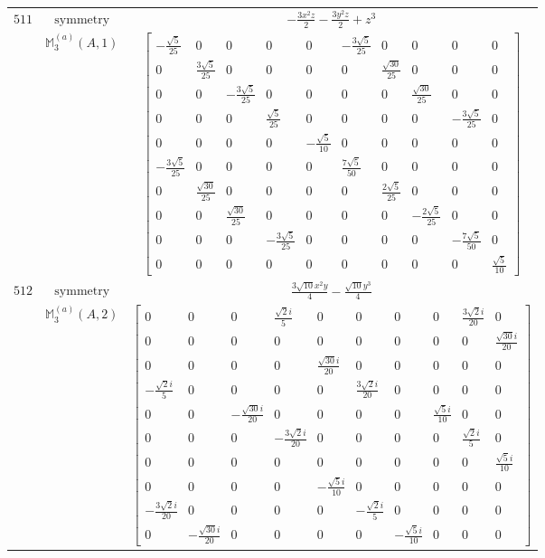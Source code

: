\documentclass[fleqn,8pt,landscape]{jsarticle}
\begin{document}
\begin{longtable}{ccc}
$ 511 $ & $ \text{symmetry} $ & $ - \frac{3 x^{2} z}{2} - \frac{3 y^{2} z}{2} + z^{3} $ \\
$  $ & $ \mathbb{M}_{3}^{(a)}(A,1) $ & $ \begin{bmatrix} - \frac{\sqrt{5}}{25} & 0 & 0 & 0 & 0 & - \frac{3 \sqrt{5}}{25} & 0 & 0 & 0 & 0 \\ 0 & \frac{3 \sqrt{5}}{25} & 0 & 0 & 0 & 0 & \frac{\sqrt{30}}{25} & 0 & 0 & 0 \\ 0 & 0 & - \frac{3 \sqrt{5}}{25} & 0 & 0 & 0 & 0 & \frac{\sqrt{30}}{25} & 0 & 0 \\ 0 & 0 & 0 & \frac{\sqrt{5}}{25} & 0 & 0 & 0 & 0 & - \frac{3 \sqrt{5}}{25} & 0 \\ 0 & 0 & 0 & 0 & - \frac{\sqrt{5}}{10} & 0 & 0 & 0 & 0 & 0 \\ - \frac{3 \sqrt{5}}{25} & 0 & 0 & 0 & 0 & \frac{7 \sqrt{5}}{50} & 0 & 0 & 0 & 0 \\ 0 & \frac{\sqrt{30}}{25} & 0 & 0 & 0 & 0 & \frac{2 \sqrt{5}}{25} & 0 & 0 & 0 \\ 0 & 0 & \frac{\sqrt{30}}{25} & 0 & 0 & 0 & 0 & - \frac{2 \sqrt{5}}{25} & 0 & 0 \\ 0 & 0 & 0 & - \frac{3 \sqrt{5}}{25} & 0 & 0 & 0 & 0 & - \frac{7 \sqrt{5}}{50} & 0 \\ 0 & 0 & 0 & 0 & 0 & 0 & 0 & 0 & 0 & \frac{\sqrt{5}}{10} \end{bmatrix} $ \\ \hline
$ 512 $ & $ \text{symmetry} $ & $ \frac{3 \sqrt{10} x^{2} y}{4} - \frac{\sqrt{10} y^{3}}{4} $ \\
$  $ & $ \mathbb{M}_{3}^{(a)}(A,2) $ & $ \begin{bmatrix} 0 & 0 & 0 & \frac{\sqrt{2} i}{5} & 0 & 0 & 0 & 0 & \frac{3 \sqrt{2} i}{20} & 0 \\ 0 & 0 & 0 & 0 & 0 & 0 & 0 & 0 & 0 & \frac{\sqrt{30} i}{20} \\ 0 & 0 & 0 & 0 & \frac{\sqrt{30} i}{20} & 0 & 0 & 0 & 0 & 0 \\ - \frac{\sqrt{2} i}{5} & 0 & 0 & 0 & 0 & \frac{3 \sqrt{2} i}{20} & 0 & 0 & 0 & 0 \\ 0 & 0 & - \frac{\sqrt{30} i}{20} & 0 & 0 & 0 & 0 & \frac{\sqrt{5} i}{10} & 0 & 0 \\ 0 & 0 & 0 & - \frac{3 \sqrt{2} i}{20} & 0 & 0 & 0 & 0 & \frac{\sqrt{2} i}{5} & 0 \\ 0 & 0 & 0 & 0 & 0 & 0 & 0 & 0 & 0 & \frac{\sqrt{5} i}{10} \\ 0 & 0 & 0 & 0 & - \frac{\sqrt{5} i}{10} & 0 & 0 & 0 & 0 & 0 \\ - \frac{3 \sqrt{2} i}{20} & 0 & 0 & 0 & 0 & - \frac{\sqrt{2} i}{5} & 0 & 0 & 0 & 0 \\ 0 & - \frac{\sqrt{30} i}{20} & 0 & 0 & 0 & 0 & - \frac{\sqrt{5} i}{10} & 0 & 0 & 0 \end{bmatrix} $ \\ \hline

\end{longtable}
\end{document}
